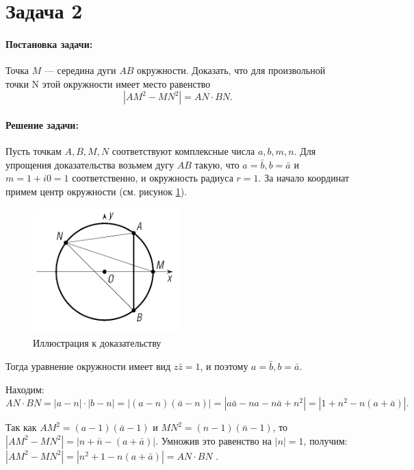 {
   \section*{Задача 2}
   \paragraph{Постановка задачи:}
   Точка \(M\) --- середина дуги \(AB\) окружности. Доказать, что для произвольной точки N этой
   окружности имеет место
   равенство
   \begin{equation}
      \left\lvert AM^2-MN^2 \right\rvert = AN \cdot BN.
      \label{t2:f1}
   \end{equation}
   \paragraph{Решение задачи:}
   Пусть точкам \(A,B,M,N\) соответствуют комплексные числа \(a,b,m,n\). Для упрощения доказательства
   возьмем дугу \(AB\) такую, что \(a = \bar{b},b = \bar{a}\) и \(m = 1 + i0 = 1\) соответственно, и
   окружность радиуса \(r = 1\). За начало координат примем центр окружности (см. рисунок \ref{t2:im}).
   \begin{figure}[h]
      \centering
      \includegraphics[width=0.5\textwidth]{images/task2.png}
      \caption{Иллюстрация к доказательству}
      \label{t2:im}
   \end{figure}
   Тогда уравнение окружности имеет
   вид \(z \bar{z}=1\), и поэтому \(a=\bar{b}, b=\bar{a}\).

   Находим:
   \(AN \cdot BN = \left\lvert a-n \right\rvert \cdot \left\lvert b-n \right\rvert
   = \left\lvert (a-n)(\bar{a}-n)\right\rvert
   = \left\lvert a\bar{a} - na - n\bar{a} + n^2 \right\rvert
   = \left\lvert 1 + n^2 - n(a+\bar{a})\right\rvert.\)

   Так как \(AM^2 =(a-1)(\bar{a}-1)\) и \(MN^2 =(n-1)(\bar{n}-1)\), то
   \(\left\lvert AM^2 - MN^2 \right\rvert = \left\lvert n+\bar{n}-(a+\bar{a}) \right\rvert\).
   Умножив это равенство на \(\left\lvert n \right\rvert=1\), получим:
   \(\left\lvert AM^2 - MN^2 \right\rvert = \left\lvert n^2 +1-n(a+\bar{a})\right\rvert = AN \cdot BN\) \cite[с. 13]{book:ponarin}.
}
